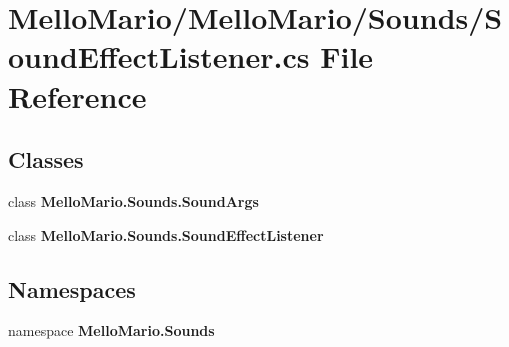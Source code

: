 \section{Mello\+Mario/\+Mello\+Mario/\+Sounds/\+Sound\+Effect\+Listener.cs File Reference}
\label{SoundEffectListener_8cs}
\subsection*{Classes}
\begin{DoxyCompactItemize}
\item 
class \textbf{ Mello\+Mario.\+Sounds.\+Sound\+Args}
\item 
class \textbf{ Mello\+Mario.\+Sounds.\+Sound\+Effect\+Listener}
\end{DoxyCompactItemize}
\subsection*{Namespaces}
\begin{DoxyCompactItemize}
\item 
namespace \textbf{ Mello\+Mario.\+Sounds}
\end{DoxyCompactItemize}
